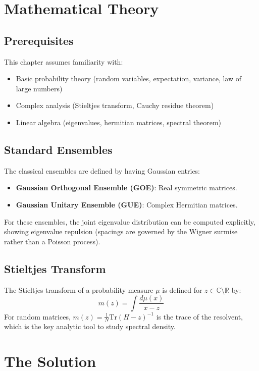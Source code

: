 \section{Mathematical Theory}


\subsection{Prerequisites}
This chapter assumes familiarity with:
\begin{itemize}
\item Basic probability theory (random variables, expectation, variance, law of large numbers)
\item Complex analysis (Stieltjes transform, Cauchy residue theorem)
\item Linear algebra (eigenvalues, hermitian matrices, spectral theorem)
\end{itemize}

\subsection{Standard Ensembles}
The classical ensembles are defined by having Gaussian entries:
\begin{itemize}
\item \textbf{Gaussian Orthogonal Ensemble (GOE)}: Real symmetric matrices.
\item \textbf{Gaussian Unitary Ensemble (GUE)}: Complex Hermitian matrices.
\end{itemize}
For these ensembles, the joint eigenvalue distribution can be computed explicitly, showing eigenvalue repulsion (spacings are governed by the Wigner surmise rather than a Poisson process).

\subsection{Stieltjes Transform}
The Stieltjes transform of a probability measure $\mu$ is defined for $z \in \mathbb{C} \setminus \mathbb{R}$ by:
\begin{equation}
m(z) = \int \frac{d\mu(x)}{x - z}
\end{equation}
For random matrices, $m(z) = \frac{1}{N} \text{Tr}(H - z)^{-1}$ is the trace of the resolvent, which is the key analytic tool to study spectral density.

\section{The Solution}

